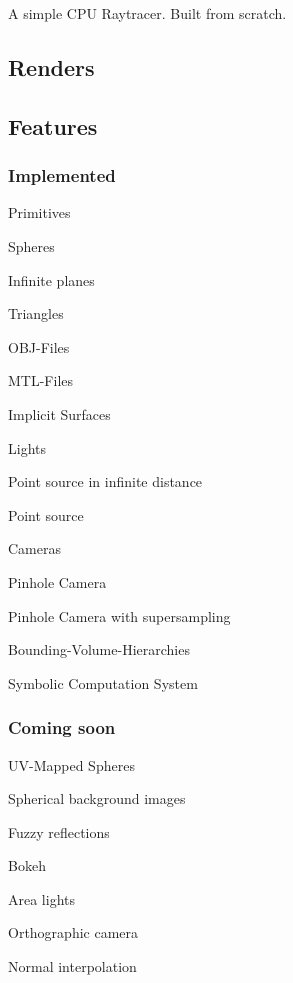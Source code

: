 A simple C\+PU Raytracer. Built from scratch.

\subsection*{Renders}



\subsection*{Features}

\subsubsection*{Implemented}


\begin{DoxyItemize}
\item Primitives
\begin{DoxyItemize}
\item Spheres
\item Infinite planes
\item Triangles
\item O\+B\+J-\/\+Files
\item M\+T\+L-\/\+Files
\item Implicit Surfaces
\end{DoxyItemize}
\item Lights
\begin{DoxyItemize}
\item Point source in infinite distance
\item Point source
\end{DoxyItemize}
\item Cameras
\begin{DoxyItemize}
\item Pinhole Camera
\item Pinhole Camera with supersampling
\end{DoxyItemize}
\item Bounding-\/\+Volume-\/\+Hierarchies
\item Symbolic Computation System
\end{DoxyItemize}

\subsubsection*{Coming soon}


\begin{DoxyItemize}
\item U\+V-\/\+Mapped Spheres
\item Spherical background images
\item Fuzzy reflections
\item Bokeh
\item Area lights
\item Orthographic camera
\item Normal interpolation 
\end{DoxyItemize}